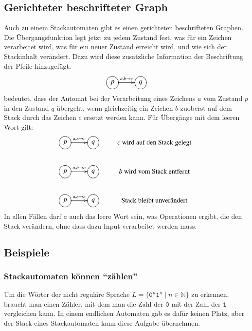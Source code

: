 \subsection{Gerichteter beschrifteter Graph}
%
Auch zu einem Stackautomaten gibt es einen gerichteten beschrifteten
Graphen. Die Übergangsfunktion legt jetzt zu jedem Zustand 
fest, was für ein Zeichen verarbeitet wird, was für ein
neuer Zustand erreicht wird, und wie sich der Stackinhalt
verändert.
Dazu wird diese zusätzliche Information der Beschriftung der Pfeile
hinzugefügt.
\[
\xymatrix{
*++[o][F]{p}\ar[r]^{a,b\to c}
	&*++[o][F]{q}
}
\]
bedeutet, dass der Automat bei der Verarbeitung eines Zeichens $a$
vom Zustand $p$ in den Zustand $q$ übergeht, wenn gleichzeitig
ein Zeichen $b$ zuoberst auf dem Stack durch das Zeichen $c$
ersetzt werden kann. Für Übergänge mit dem leeren Wort gilt:
\[
\xymatrix{
*++[o][F]{p}\ar[r]^{a,\varepsilon\to c}
	&*++[o][F]{q}
		&\text{$c$ wird auf den Stack gelegt}
\\
*++[o][F]{p}\ar[r]^{a,b\to\varepsilon}
	&*++[o][F]{q}
		&\text{$b$ wird vom Stack entfernt}
\\
*++[o][F]{p}\ar[r]^{a,\varepsilon\to\varepsilon}
	&*++[o][F]{q}
		&\text{Stack bleibt unverändert}
}
\]
In allen Fällen darf $a$ auch das leere Wort sein, was Operationen
ergibt, die den Stack verändern, ohne dass dazu Input verarbeitet werden
muss.


\subsection{Beispiele\label{stackbeispiele}}
\subsubsection{Stackautomaten können ``zählen''}
Um die Wörter der nicht reguläre Sprache
$L=\{\texttt{0}^n\texttt{1}^n\;|\;n\in \mathbb N\}$
zu erkennen, braucht man einen Zähler, mit dem man die Zahl der $\texttt{0}$
mit der Zahl der $\texttt{1}$ vergleichen kann. In einem endlichen Automaten
gab es dafür keinen Platz, aber der Stack eines Stackautomaten kann
diese Aufgabe übernehmen.

